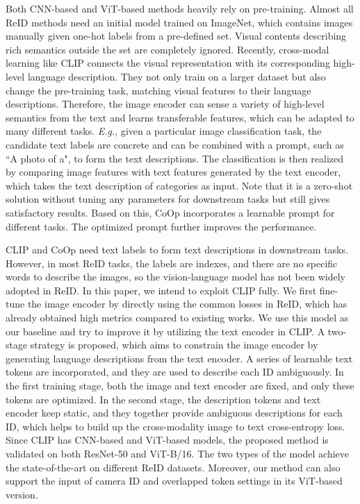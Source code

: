 \documentclass[letterpaper]{article} \usepackage{aaai23}  \usepackage{times}  \usepackage{helvet}  \usepackage{courier}  \usepackage[hyphens]{url}  \usepackage{graphicx} \urlstyle{rm} \def\UrlFont{\rm}  \usepackage{natbib}  \usepackage{caption} \frenchspacing  \setlength{\pdfpagewidth}{8.5in}  \setlength{\pdfpageheight}{11in}  \usepackage{algorithm}
\begin{document}
Both CNN-based and ViT-based methods heavily rely on pre-training. Almost all ReID methods need an initial model trained on ImageNet, which contains images manually given one-hot labels from a pre-defined set. Visual contents describing rich semantics outside the set are completely ignored. Recently, cross-modal learning like CLIP \cite{CLIP} connects the visual representation with its corresponding high-level language description. They not only train on a larger dataset but also change the pre-training task, matching visual features to their language descriptions. Therefore, the image encoder can sense a variety of high-level semantics from the text and learns transferable features, which can be adapted to many different tasks. \emph{E.g.}, given a particular image classification task, the candidate text labels are concrete and can be combined with a prompt, such as ``A photo of a", to form the text descriptions. The classification is then realized by comparing image features with text features generated by the text encoder, which takes the text description of categories as input. Note that it is a zero-shot solution without tuning any parameters for downstream tasks but still gives satisfactory results. Based on this, CoOp \cite{CoOP} incorporates a learnable prompt for different tasks. The optimized prompt further improves the performance.

CLIP and CoOp need text labels to form text descriptions in downstream tasks. However, in most ReID tasks, the labels are indexes, and there are no specific words to describe the images, so the vision-language model has not been widely adopted in ReID. In this paper, we intend to exploit CLIP fully. We first fine-tune the image encoder by directly using the common losses in ReID, which has already obtained high metrics compared to existing works. We use this model as our baseline and try to improve it by utilizing the text encoder in CLIP. A two-stage strategy is proposed, which aims to constrain the image encoder by generating language descriptions from the text encoder. A series of learnable text tokens are incorporated, and they are used to describe each ID ambiguously. In the first training stage, both the image and text encoder are fixed, and only these tokens are optimized. In the second stage, the description tokens and text encoder keep static, and they together provide ambiguous descriptions for each ID, which helps to build up the cross-modality image to text cross-entropy loss. Since CLIP has CNN-based and ViT-based models, the proposed method is validated on both ResNet-50 and ViT-B/16. The two types of the model achieve the state-of-the-art on different ReID datasets. Moreover, our method can also support the input of camera ID and overlapped token settings in its ViT-based version.
\end{document}
